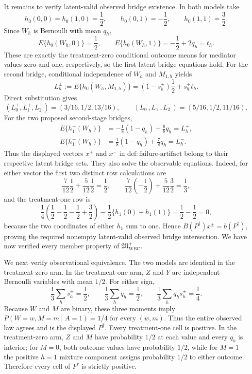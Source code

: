 It remains to verify latent-valid observed bridge existence.  In both models
take
\[
 h_0(0,0)=h_0(1,0)=\frac12,\qquad
 h_0(0,1)=-\frac12,\qquad h_0(1,1)=\frac32.
\]
Since \(W_h\) is Bernoulli with mean \(q_h\),
\[
 E\{h_0(W_h,0)\}=\frac12,\qquad
 E\{h_0(W_h,1)\}=-\frac12+2q_h=t_h.
\]
These are exactly the treatment-zero conditional outcome means for mediator
values zero and one, respectively, so the first latent bridge equations hold.
For the second bridge, conditional independence of \(W_h\) and
\(M_{1,h}\) yields
\[
 L_h^{\pm}:=E\{h_0(W_h,M_{1,h})\}
   =(1-s_h^{\pm})\frac12+s_h^{\pm}t_h.
\]
Direct substitution gives
\[
 (L_0^+,L_1^+,L_2^+)=(3/16,1/2,13/16),\qquad
 (L_0^-,L_1^-,L_2^-)=(5/16,1/2,11/16).
\]
For the two proposed second-stage bridges,
\[
\begin{aligned}
 E\{h_1^+(W_h)\}
   &=-\frac18(1-q_h)+\frac98q_h=L_h^+,\\
 E\{h_1^-(W_h)\}
   &= \frac18(1-q_h)+\frac78q_h=L_h^-.
\end{aligned}
\]
Thus the displayed vectors \(x^+\) and \(x^-\) in
\(\mathrm{def{:}failure\text{-}artifact}\) belong to their respective
latent bridge sets.  They also solve the observable equations.  Indeed, for
either vector the first two distinct row calculations are
\[
 \frac7{12}\frac12+\frac5{12}\frac12=\frac12,
 \qquad
 \frac7{12}\left(-\frac12\right)
   +\frac5{12}\frac32=\frac13,
\]
and the treatment-one row is
\[
 \frac14\left(\frac12+\frac12-\frac12+\frac32\right)
 -\frac12\{h_1(0)+h_1(1)\}=\frac12-\frac12=0,
\]
because the two coordinates of either \(h_1\) sum to one.  Hence
\(B(P^{\dagger})x^{\pm}=b(P^{\dagger})\), proving the required nonempty
latent-valid observed bridge intersection.  We have now verified every member
property of \(\mathfrak M_{\mathrm{WBC}}^{+}\).

We next verify observational equivalence.  The two models are identical in
the treatment-zero arm.  In the treatment-one arm, \(Z\) and \(Y\) are
independent Bernoulli variables with mean \(1/2\).  For either sign,
\[
 \frac13\sum_h s_h^{\pm}=\frac12,\qquad
 \frac13\sum_h q_h=\frac12,\qquad
 \frac13\sum_h q_hs_h^{\pm}=\frac14.
\]
Because \(W\) and \(M\) are binary, these three moments imply
\(P(W=w,M=m\mid A=1)=1/4\) for every \((w,m)\).  Thus the entire observed
law agrees and is the displayed \(P^{\dagger}\).  Every treatment-one cell
is positive.  In the treatment-zero arm, \(Z\) and \(M\) have probability
\(1/2\) at each value and every \(q_h\) is interior; for \(M=0\), both
outcome values have probability \(1/2\), while for \(M=1\) the positive
\(h=1\) mixture component assigns probability \(1/2\) to either outcome.
Therefore every cell of \(P^{\dagger}\) is strictly positive.

